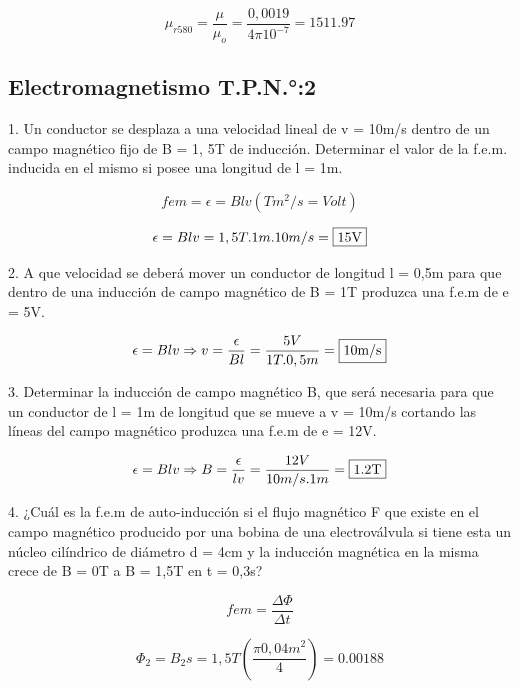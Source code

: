 \documentclass[../main]{subfiles}
\begin{document}
\begin{equation}
  \mu_{r580}=\frac{\mu}{\mu_o}= \frac{0,0019}{4\pi 10^{-7}}=
  1511.97
\end{equation}

\subsection{Electromagnetismo T.P.N.°:2}

1. Un conductor se desplaza a una velocidad lineal de v = 10m/s
dentro de un campo magnético
fijo de B = 1, 5T de inducción. Determinar el valor de la f.e.m.
inducida en el mismo si posee una longitud de l = 1m.

\begin{equation}
  fem=\epsilon= B l v (Tm^2/s=Volt)
\end{equation}

\begin{equation}
  \epsilon= B l v =1,5T . 1m .10m/s=\fbox{15V}
\end{equation}

2. A que velocidad se deberá mover un conductor de longitud l = 0,5m
para que dentro de una
inducción de campo magnético de B = 1T produzca una f.e.m de e = 5V.

\begin{equation}
  \epsilon= B l v \Rightarrow
  v=\frac{\epsilon}{Bl}=\frac{5V}{1T.0,5m}=\fbox{10m/s}
\end{equation}

3. Determinar la inducción de campo magnético B, que será necesaria
para que un conductor
de l = 1m de longitud que se mueve a v = 10m/s cortando las líneas
del campo magnético
produzca una f.e.m de e = 12V.

\begin{equation}
  \epsilon= B l v \Rightarrow
  B=\frac{\epsilon}{lv}=\frac{12V}{10m/s.1m}=\fbox{1.2T}
\end{equation}

4. ¿Cuál es la f.e.m de auto-inducción si el flujo magnético F que
existe en el campo magnético
producido por una bobina de una electroválvula si tiene esta un
núcleo cilíndrico de diámetro
d = 4cm y la inducción magnética en la misma crece de B = 0T a B =
1,5T en t = 0,3s?

\begin{equation}
  fem= \frac{\Delta \Phi}{\Delta t}
\end{equation}

\begin{equation}
  \Phi_2=B_2s=1,5T (\frac{\pi {0,04m}^2}{4})=0.00188
\end{equation}
\end{document}
